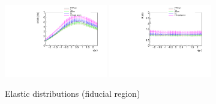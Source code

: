 \begin{figure}[h!]
\includegraphics[width=0.4\textwidth]{figures/etal_elastic_cut.pdf}
\includegraphics[width=0.4\textwidth]{figures/Ratioetal_elastic_cut.pdf}
\caption{Elastic distributions (fiducial region)}
\label{fig:elastic_cut}
\end{figure}

